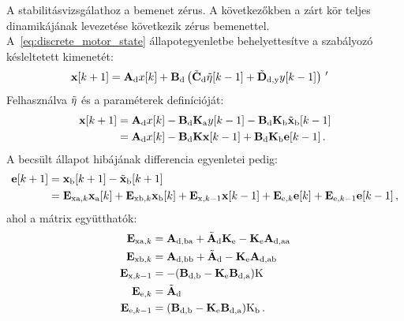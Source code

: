 A stabilitásvizsgálathoz a bemenet zérus. A következőkben a zárt kör teljes dinamikájának levezetése 
következik zérus bemenettel. A~\eqref{eq:discrete_motor_state} állapotegyenletbe behelyettesítve a 
szabályozó késleltetett kimenetét:
\begin{align}
    \begin{split}
    \mathbf{x}[k+1] &= \mathbf{A}_{\mathrm{d}} x[k] + 
    \mathbf{B}_{\mathrm{d}} \left(\tilde{\mathbf{C}}_{\mathrm{d}} \tilde{\mathbf{\eta}}[k-1] + 
    \tilde{\mathbf{D}}_{\mathrm{d,y}} y[k-1]\right)\,'
    \end{split}        
\end{align}
Felhasználva \(\tilde{\mathbf{\eta}}\) és a paraméterek definícióját:
\begin{align}\label{eq:discrete_motor_state_closed}
    \begin{split}
        \mathbf{x}[k+1] &= \mathbf{A}_{\mathrm{d}} x[k] - 
        \mathbf{B}_{\mathrm{d}} \mathbf{K}_{\mathrm{a}} y[k-1] - 
        \mathbf{B}_{\mathrm{d}} \mathbf{K}_{\mathrm{b}} \tilde{\mathbf{x}}_{\mathrm{b}}[k-1] \\
        &= \mathbf{A}_{\mathrm{d}} x[k] - 
        \mathbf{B}_{\mathrm{d}} \mathbf{K} \mathbf{x}[k-1] +
        \mathbf{B}_{\mathrm{d}} \mathbf{K}_{\mathrm{b}} \mathbf{e}[k-1]\,.
    \end{split}        
\end{align}
A becsült állapot hibájának differencia egyenletei pedig:
\begin{align}
    \begin{split}
        \mathbf{e}[k+1] &= \mathbf{x}_{\mathrm{b}}[k+1] - \tilde{\mathbf{x}}_{\mathrm{b}}[k+1] \\
        &= \mathbf{E}_{\mathrm{xa},k}\mathbf{x}_{\mathrm{a}}[k] + 
        \mathbf{E}_{\mathrm{xb},k}\mathbf{x}_{\mathrm{b}}[k] + 
        \mathbf{E}_{\mathrm{x},k-1}\mathbf{x}[k-1] + 
        \mathbf{E}_{\mathrm{e},k}\mathbf{e}[k] + 
        \mathbf{E}_{\mathrm{e},k-1}\mathbf{e}[k-1]
        \,,
    \end{split}        
\end{align}
ahol a mátrix együtthatók:
\begin{align}
    \begin{split}
        \mathbf{E}_{\mathrm{xa},k} &= \mathbf{A}_{\mathrm{d,ba}} + 
        \tilde{\mathbf{A}}_{\mathrm{d}} \mathbf{K}_{\mathrm{e}} -
        \mathbf{K}_{\mathrm{e}} \mathbf{A}_{\mathrm{d,aa}} \\
        \mathbf{E}_{\mathrm{xb},k} &= \mathbf{A}_{\mathrm{d,bb}} + 
        \tilde{\mathbf{A}}_{\mathrm{d}} -
        \mathbf{K}_{\mathrm{e}} \mathbf{A}_{\mathrm{d,ab}} \\
        \mathbf{E}_{\mathrm{x},k-1} &= -(\mathbf{B}_{\mathrm{d,b}} -
        \mathbf{K}_{\mathrm{e}} \mathbf{B}_{\mathrm{d,a}})\mathrm{K} \\
        \mathbf{E}_{\mathrm{e},k} &= \tilde{\mathbf{A}}_{\mathrm{d}} \\
        \mathbf{E}_{\mathrm{e},k-1} &= (\mathbf{B}_{\mathrm{d,b}} -
        \mathbf{K}_{\mathrm{e}} \mathbf{B}_{\mathrm{d,a}})\mathrm{K}_{\mathrm{b}}\,.
    \end{split}        
\end{align}
